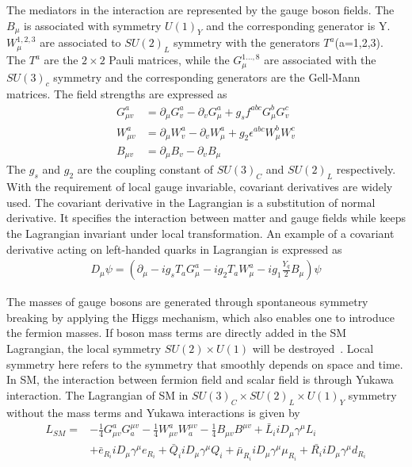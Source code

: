 The mediators in the interaction are represented by the gauge boson fields. The $B_{\mu}$ is associated with symmetry $U(1)_{Y}$ and the corresponding generator is Y. $W_{\mu}^{1,2,3}$ are associated to $SU(2)_{L}$ symmetry with the generators $T^{a}$(a=1,2,3). The $T^{a}$ are the $2\times2$ Pauli matrices, while the $G_{\mu}^{1...,8}$ are associated with the $SU(3)_{c}$ symmetry and the corresponding generators are the Gell-Mann matrices.  The field strengths are expressed as 
\begin{equation}
  \begin{aligned}
G^{a}_{\mu v}&=\partial_{\mu}G^{a}_{v}-\partial_{v}G^{a}_{\mu}+g_{s}f^{abc}G^{b}_{\mu}G^{c}_{v}\\
W^{a}_{\mu v}&=\partial_{\mu}W^{a}_{v}-\partial_{v}W^{a}_{\mu}+g_{2}\epsilon^{abc}W^{b}_{\mu}W^{c}_{v}\\
B_{\mu v}       &=\partial_{\mu}B_{v}-\partial_{v}B_{\mu}
  \end{aligned}
\end{equation}
The $g_{s}$ and $g_{2}$ are the coupling constant of $SU(3)_{C}$ and $SU(2)_{L}$ respectively. With the requirement of local gauge invariable, covariant derivatives are widely used. The covariant derivative in the Lagrangian is a substitution of normal derivative. It specifies the interaction between matter and gauge fields while keeps the Lagrangian invariant under local transformation. An example of a covariant derivative acting on left-handed quarks in Lagrangian is expressed as
\begin{equation}
  \begin{aligned}
D_{\mu}\psi = (\partial_{\mu}-ig_{s}T_{a}G^{a}_{\mu}-ig_{2}T_{a}W^{a}_{\mu}-ig_{1}\frac{Y_{q}}{2}B_{\mu})\psi
  \end{aligned}
\end{equation} 

The masses of gauge bosons are generated through spontaneous symmetry breaking by applying the Higgs mechanism, which also enables one to introduce the fermion masses. If boson mass terms are directly added in the SM Lagrangian, the local symmetry $SU(2)\times U(1)$ will be destroyed~\cite{DJOUADI20081}. Local symmetry here refers to the symmetry that smoothly depends on space and time. In SM, the interaction between fermion field and scalar field is through Yukawa interaction. The Lagrangian of SM in $SU(3)_{C}\times SU(2)_{L}\times U(1)_{Y}$ symmetry without the mass terms and Yukawa interactions is given by
 \begin{equation}
  \begin{aligned}
L_{SM}=&-\frac{1}{4}G^{a}_{\mu v}G^{\mu v}_{a}-\frac{1}{4}W^{a}_{\mu v}W^{\mu v}_{a}-\frac{1}{4}B_{\mu v}B^{\mu v}+\bar{L}_{i}iD_{\mu}\gamma^{\mu}L_{i}\\
              &+\bar{e}_{R_{i}}iD_{\mu}\gamma^{\mu}e_{R_{i}}+\bar{Q}_{i}iD_{\mu}\gamma^{\mu}Q_{i}+\bar{\mu}_{R_{i}}iD_{\mu}\gamma^{\mu}\mu_{R_{i}}+\bar{R_{i}}iD_{\mu}\gamma^{\mu}d_{R_{i}}
  \end{aligned}
\end{equation} 






